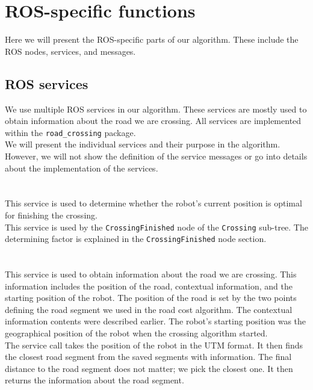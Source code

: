 \section{ROS-specific functions}
    Here we will present the ROS-specific parts of our algorithm. These include the ROS nodes, services, and messages.

    \subsection{ROS services}
        We use multiple ROS services in our algorithm. These services are mostly used to obtain information about the road we are crossing. All services are implemented within the \texttt{road\_crossing} package.\\
        We will present the individual services and their purpose in the algorithm. However, we will not show the definition of the service messages or go into details about the implementation of the services.\\\\
        \\
            This service is used to determine whether the robot's current position is optimal for finishing the crossing.\\
            This service is used by the \texttt{CrossingFinished} node of the \texttt{Crossing} sub-tree. The determining factor is explained in the \texttt{CrossingFinished} node section.\\\\
        \\
            This service is used to obtain information about the road we are crossing. This information includes the position of the road, contextual information, and the starting position of the robot. The position of the road is set by the two points defining the road segment we used in the road cost algorithm. The contextual information contents were described earlier. The robot's starting position was the geographical position of the robot when the crossing algorithm started.\\
            The service call takes the position of the robot in the UTM format. It then finds the closest road segment from the saved segments with information. The final distance to the road segment does not matter; we pick the closest one. It then returns the information about the road segment.\\\\
        \\
